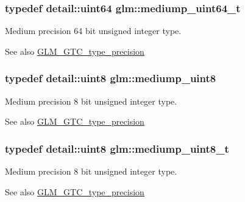 \subsubsection[{mediump\+\_\+uint64\+\_\+t}]{\setlength{\rightskip}{0pt plus 5cm}typedef detail\+::uint64 {\bf glm\+::mediump\+\_\+uint64\+\_\+t}}\label{group__gtc__type__precision_gaa97354d3120a6dc029a5e9563723de18}
Medium precision 64 bit unsigned integer type. \begin{DoxySeeAlso}{See also}
\hyperlink{group__gtc__type__precision}{G\+L\+M\+\_\+\+G\+T\+C\+\_\+type\+\_\+precision} 
\end{DoxySeeAlso}
\hypertarget{group__gtc__type__precision_gac4b849eaac0543a10f97f4bdda4850a8}{}
\subsubsection[{mediump\+\_\+uint8}]{\setlength{\rightskip}{0pt plus 5cm}typedef {\bf detail\+::uint8} {\bf glm\+::mediump\+\_\+uint8}}\label{group__gtc__type__precision_gac4b849eaac0543a10f97f4bdda4850a8}
Medium precision 8 bit unsigned integer type. \begin{DoxySeeAlso}{See also}
\hyperlink{group__gtc__type__precision}{G\+L\+M\+\_\+\+G\+T\+C\+\_\+type\+\_\+precision} 
\end{DoxySeeAlso}
\hypertarget{group__gtc__type__precision_gadfa38f3c245d371c4b2079f1fd68928b}{}
\subsubsection[{mediump\+\_\+uint8\+\_\+t}]{\setlength{\rightskip}{0pt plus 5cm}typedef {\bf detail\+::uint8} {\bf glm\+::mediump\+\_\+uint8\+\_\+t}}\label{group__gtc__type__precision_gadfa38f3c245d371c4b2079f1fd68928b}
Medium precision 8 bit unsigned integer type. \begin{DoxySeeAlso}{See also}
\hyperlink{group__gtc__type__precision}{G\+L\+M\+\_\+\+G\+T\+C\+\_\+type\+\_\+precision} 
\end{DoxySeeAlso}
\hypertarget{group__gtc__type__precision_gae7a1571503f83d2264ddfa705a6b082a}{}
